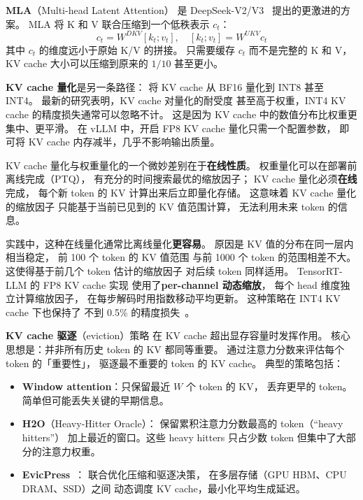 \textbf{MLA}（Multi-head Latent Attention）
是 DeepSeek-V2/V3~\cite{deepseekv3} 提出的更激进的方案。
MLA 将 K 和 V 联合压缩到一个低秩表示 $c_t$：
\begin{equation}
  c_t = W^{DKV} [k_t; v_t], \quad
  [k_t; v_t] = W^{UKV} c_t
\end{equation}
其中 $c_t$ 的维度远小于原始 K/V 的拼接。
只需要缓存 $c_t$ 而不是完整的 K 和 V，
KV cache 大小可以压缩到原来的 $1/10$ 甚至更小。

\textbf{KV cache 量化}是另一条路径：
将 KV cache 从 BF16 量化到 INT8 甚至 INT4。
最新的研究表明，KV cache 对量化的耐受度
甚至高于权重，INT4 KV cache 的精度损失通常可以忽略不计。
这是因为 KV cache 中的数值分布比权重更集中、更平滑。
在 vLLM 中，开启 FP8 KV cache 量化只需一个配置参数，
即可将 KV cache 内存减半，几乎不影响输出质量。

KV cache 量化与权重量化的一个微妙差别在于\textbf{在线性质}。
权重量化可以在部署前离线完成（PTQ），
有充分的时间搜索最优的缩放因子；
KV cache 量化必须\textbf{在线}完成，
每个新 token 的 KV 计算出来后立即量化存储。
这意味着 KV cache 量化的缩放因子
只能基于当前已见到的 KV 值范围计算，
无法利用未来 token 的信息。

实践中，这种在线量化通常比离线量化\textbf{更容易}。
原因是 KV 值的分布在同一层内相当稳定，
前 100 个 token 的 KV 值范围
与前 1000 个 token 的范围相差不大。
这使得基于前几个 token 估计的缩放因子
对后续 token 同样适用。
TensorRT-LLM 的 FP8 KV cache 实现
使用了\textbf{per-channel 动态缩放}，
每个 head 维度独立计算缩放因子，
在每步解码时用指数移动平均更新。
这种策略在 INT4 KV cache 下也保持了
不到 0.5\% 的精度损失~\cite{hooper2024fp8}。

\textbf{KV cache 驱逐}（eviction）策略
在 KV cache 超出显存容量时发挥作用。
核心思想是：并非所有历史 token 的 KV 都同等重要。
通过注意力分数来评估每个 token 的「重要性」，
驱逐最不重要的 token 的 KV cache。
典型的策略包括：
\begin{itemize}[noitemsep]
  \item \textbf{Window attention}：只保留最近 $W$ 个 token 的 KV，
        丢弃更早的 token。简单但可能丢失关键的早期信息。
  \item \textbf{H2O}（Heavy-Hitter Oracle）：
        保留累积注意力分数最高的 token（“heavy hitters”）
        加上最近的窗口。这些 heavy hitters 只占少数 token
        但集中了大部分的注意力权重。
  \item \textbf{EvicPress}~\cite{feng2024evicpress}：
        联合优化压缩和驱逐决策，
        在多层存储（GPU HBM、CPU DRAM、SSD）之间
        动态调度 KV cache，最小化平均生成延迟。
\end{itemize}

